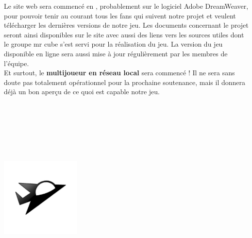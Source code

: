 \documentclass[10pt, titlepage]{report}
\begin{document}
Le site web sera commencé en , probablement sur le logiciel Adobe DreamWeaver, pour pouvoir tenir au courant tous les fans qui suivent notre projet et veulent télécharger les dernières versions de notre jeu. Les documents concernant le projet seront ainsi disponibles sur le site avec aussi des liens vers les sources utiles dont le groupe mr cube s'est servi pour la réalisation du jeu. La version du jeu disponible en ligne sera aussi mise à jour régulièrement par les membres de l'équipe. \\


 Et surtout, le \textbf{multijoueur en réseau local} sera commencé ! Il ne sera sans doute pas totalement opérationnel pour la prochaine soutenance, mais il donnera déjà un bon aperçu de ce quoi est capable notre jeu.
\\ \\ \\ \\ \\ \\ \\

\begin{center}
\includegraphics[height=4cm, width=4cm]{vaisseux_petit.png}
\end{center}
\end{document}
